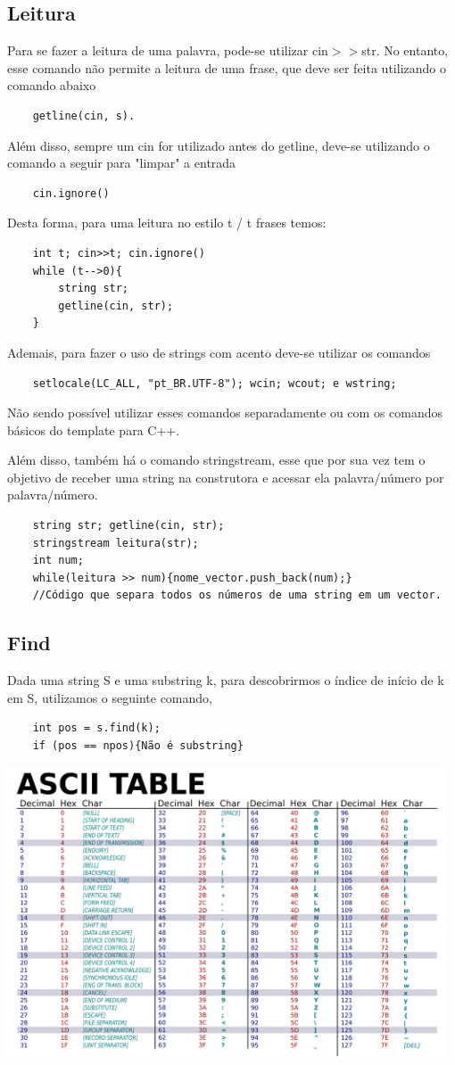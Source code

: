 \subsection{Leitura}
Para se fazer a leitura de uma palavra, pode-se utilizar cin$>>$str. No entanto, 
esse comando não permite a leitura de uma frase, que deve ser feita utilizando 
o comando abaixo
\begin{verbatim}
    getline(cin, s).
\end{verbatim}
Além disso, sempre um cin for utilizado antes do getline, deve-se utilizando o comando
a seguir para "limpar" a entrada
\begin{verbatim}
    cin.ignore()
\end{verbatim}
Desta forma, para uma leitura no estilo t / t frases temos:
\begin{verbatim}
    int t; cin>>t; cin.ignore()
    while (t-->0){
        string str;
        getline(cin, str);
    }
\end{verbatim}
Ademais, para fazer o uso de strings com acento deve-se utilizar os comandos
\begin{verbatim}
    setlocale(LC_ALL, "pt_BR.UTF-8"); wcin; wcout; e wstring;
\end{verbatim}
Não sendo possível utilizar esses comandos separadamente ou com os comandos
básicos do template para C++.

Além disso, também há o comando stringstream, esse que por sua vez tem o objetivo de
receber uma string na construtora e acessar ela palavra/número por palavra/número.
\begin{verbatim}
    string str; getline(cin, str);
    stringstream leitura(str);
    int num;
    while(leitura >> num){nome_vector.push_back(num);}
    //Código que separa todos os números de uma string em um vector.
\end{verbatim}

\subsection{Find}
Dada uma string S e uma substring k, para descobrirmos o índice de início de k em S, 
utilizamos o seguinte comando,
\begin{verbatim}
    int pos = s.find(k);
    if (pos == npos){Não é substring}
\end{verbatim}



\includegraphics[width=130mm]{6_strings/ASCII.png}
\pagebreak

